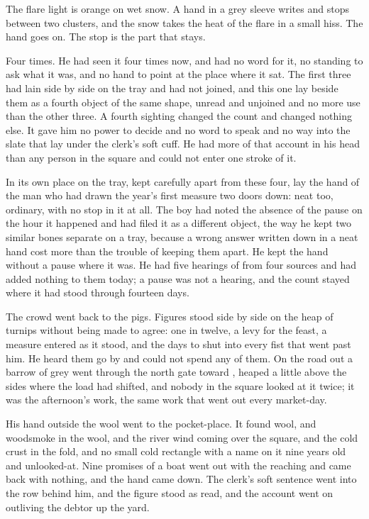 The flare light is orange on wet snow. A hand in a grey sleeve writes and stops between two clusters, and the snow takes the heat of the flare in a small hiss. The hand goes on. The stop is the part that stays.

Four times. He had seen it four times now, and had no word for it, no standing to ask what it was, and no hand to point at the place where it sat. The first three had lain side by side on the tray and had not joined, and this one lay beside them as a fourth object of the same shape, unread and unjoined and no more use than the other three. A fourth sighting changed the count and changed nothing else. It gave him no power to decide and no word to speak and no way into the slate that lay under the clerk's soft cuff. He had more of that account in his head than any person in the square and could not enter one stroke of it.

In its own place on the tray, kept carefully apart from these four, lay the hand of the man who had drawn the year's first measure two doors down: neat too, ordinary, with no stop in it at all. The boy had noted the absence of the pause on the hour it happened and had filed it as a different object, the way he kept two similar bones separate on a tray, because a wrong answer written down in a neat hand cost more than the trouble of keeping them apart. He kept the hand without a pause where it was. He had five hearings of  from four sources and had added nothing to them today; a pause was not a hearing, and the count stayed where it had stood through fourteen days.

The crowd went back to the pigs. Figures stood side by side on the heap of turnips without being made to agree: one in twelve, a levy for the feast, a measure entered as it stood, and the days to  shut into every fist that went past him. He heard them go by and could not spend any of them. On the road out a barrow of grey went through the north gate toward , heaped a little above the sides where the load had shifted, and nobody in the square looked at it twice; it was the afternoon's work, the same work that went out every market-day.

His hand outside the wool went to the pocket-place. It found wool, and woodsmoke in the wool, and the river wind coming over the square, and the cold crust in the fold, and no small cold rectangle with a name on it nine years old and unlooked-at. Nine promises of a boat went out with the reaching and came back with nothing, and the hand came down. The clerk's soft sentence went into the row behind him, and the figure stood as read, and the account went on outliving the debtor up the yard.

